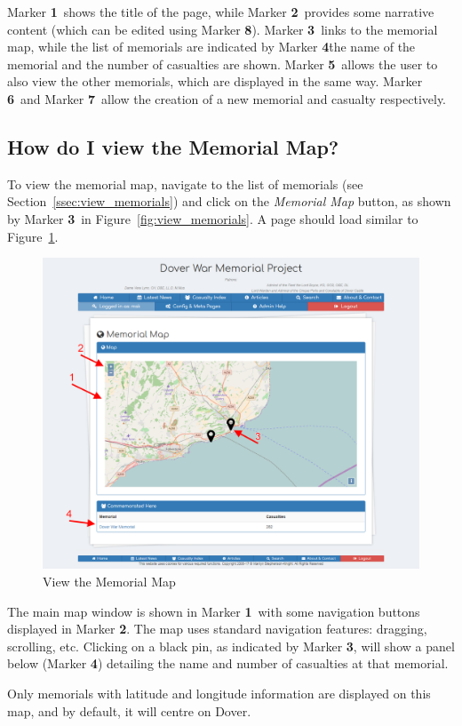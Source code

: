 \documentclass[12pt]{article}
\newcommand{\marker}[1]{Marker \color{red}\textbf{#1}\color{black}}
\begin{document}
\marker{1}\ shows the title of the page, while \marker{2}\ provides some narrative content (which can be edited using \marker{8}). \marker{3}\ links to the memorial map, while the list of memorials are indicated by \marker{4}\. the name of the memorial and the number of casualties are shown. \marker{5}\ allows the user to also view the other memorials, which are displayed in the same way. \marker{6}\ and \marker{7}\ allow the creation of a new memorial and casualty respectively.

\newpage
\FloatBarrier
\subsection{How do I view the Memorial Map?}
To view the memorial map, navigate to the list of memorials (see Section~\ref{ssec:view_memorials}) and click on the \textit{Memorial Map} button, as shown by \marker{3}\ in Figure~\ref{fig:view_memorials}. A page should load similar to Figure~\ref{fig:view_map}.

\begin{figure}[h]
  \centering
 \includegraphics[width=.9\textwidth]{pics/view_map.png}
	\caption{View the Memorial Map}\label{fig:view_map}
\end{figure}

The main map window is shown in \marker{1}\ with some navigation buttons displayed in \marker{2}. The map uses standard navigation features: dragging, scrolling, etc. Clicking on a black pin, as indicated by \marker{3}, will show a panel below (\marker{4}) detailing the name and number of casualties at that memorial.
\begin{infoBox}
Only memorials with latitude and longitude information are displayed on this map, and by default, it will centre on Dover.
\end{infoBox}
\end{document}
